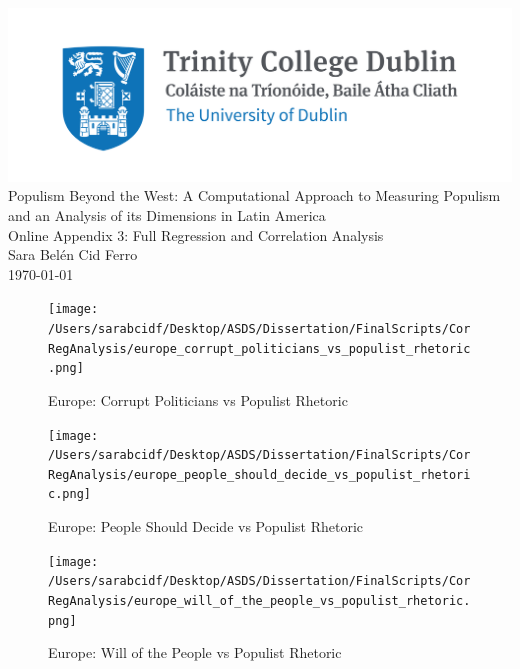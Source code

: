 \documentclass[12pt,letterpaper]{article}
\begin{document}
	
	
	\begin{titlepage}
		\centering
		\vspace*{1cm} %
		
		\includegraphics[width=\textwidth]{Trinity_RGB_transparent_main.png}\\[1cm]
		
		{\LARGE Populism Beyond the West: A Computational Approach to Measuring Populism and an Analysis of its Dimensions in Latin America}\\[1cm]
		{\Large Online Appendix 3: Full Regression and Correlation Analysis}\\[0.3cm]
		
		\Large Sara Belén Cid Ferro \\[1cm]
		
		{\large \today}
	\end{titlepage}
	
	
	\listoffigures

\newpage
	
\begin{figure}[H]
	\centering
	\caption{Europe: Corrupt Politicians vs Populist Rhetoric}
	\label{fig:europe_corrupt_politicians_vs_populist_rhetoric}
	\texttt{[image: /Users/sarabcidf/Desktop/ASDS/Dissertation/FinalScripts/CorRegAnalysis/europe\_corrupt\_politicians\_vs\_populist\_rhetoric.png]}
\end{figure}

\begin{figure}[H]
	\centering
	\caption{Europe: People Should Decide vs Populist Rhetoric}
	\label{fig:europe_people_should_decide_vs_populist_rhetoric}
	\texttt{[image: /Users/sarabcidf/Desktop/ASDS/Dissertation/FinalScripts/CorRegAnalysis/europe\_people\_should\_decide\_vs\_populist\_rhetoric.png]}
\end{figure}

\begin{figure}[H]
	\centering
	\caption{Europe: Will of the People vs Populist Rhetoric}
	\label{fig:europe_will_of_the_people_vs_populist_rhetoric}
	\texttt{[image: /Users/sarabcidf/Desktop/ASDS/Dissertation/FinalScripts/CorRegAnalysis/europe\_will\_of\_the\_people\_vs\_populist\_rhetoric.png]}
\end{figure}
\end{document}
